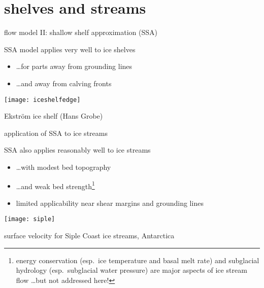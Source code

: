 
\section{shelves and streams}

\begin{frame}{flow model II: shallow shelf approximation (SSA)}
  
SSA model applies very well to \alert{ice shelves}
\begin{itemize}
\item \dots for parts away from grounding lines
\item \dots and away from calving fronts
\end{itemize}

\bigskip

\begin{center}
  \texttt{[image: iceshelfedge]}

\tiny Ekstr\"om ice shelf (Hans Grobe)
\end{center}
\end{frame}


\begin{frame}{application of SSA to ice streams}

SSA also applies reasonably well to \alert{ice streams}
\begin{itemize}
\item \dots with modest bed topography
\item \dots and weak bed strength\footnote{energy conservation (esp.~ice temperature and basal melt rate) and subglacial hydrology (esp.~subglacial water pressure) are major aspects of ice stream flow \dots but not addressed here!}
\item limited applicability near shear margins and grounding lines
\end{itemize}

\begin{center}
  \texttt{[image: siple]}

\tiny surface velocity for Siple Coast ice streams, Antarctica 
\end{center}
\end{frame}


